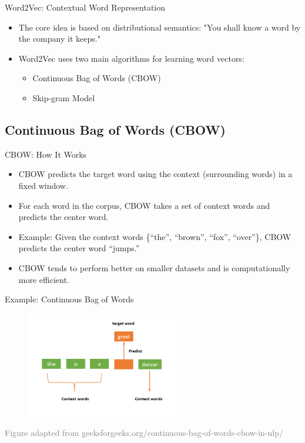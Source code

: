 \documentclass[serif, aspectratio=169]{beamer}
\begin{document}
\begin{frame}{Word2Vec: Contextual Word Representation}
    \begin{itemize}
        \item The core idea is based on distributional semantics: "You shall know a word by the company it keeps."
        \item Word2Vec uses two main algorithms for learning word vectors:
        \begin{itemize}
            \item Continuous Bag of Words (CBOW)
            \item Skip-gram Model
        \end{itemize}
    \end{itemize}
\end{frame}

\subsection{Continuous Bag of Words (CBOW)}

\begin{frame}{CBOW: How It Works}
    \begin{itemize}
        \item CBOW predicts the target word using the context (surrounding words) in a fixed window.
        \item For each word in the corpus, CBOW takes a set of context words and predicts the center word.
        \item Example: Given the context words \{“the”, “brown”, “fox”, “over”\}, CBOW predicts the center word “jumps.”
        \item CBOW tends to perform better on smaller datasets and is computationally more efficient.
    \end{itemize}
\end{frame}

\begin{frame}{Example: Continuous Bag of Words}
	\begin{figure}
		\centering
		\includegraphics[width=0.6\textwidth]{pic/cbow.png}
	\end{figure}
	\vspace{0.4cm}
	\hspace{-1.0cm}
	{\tiny \textcolor{gray}{Figure adapted from geeksforgeeks.org/continuous-bag-of-words-cbow-in-nlp/}}
\end{frame}
\end{document}
